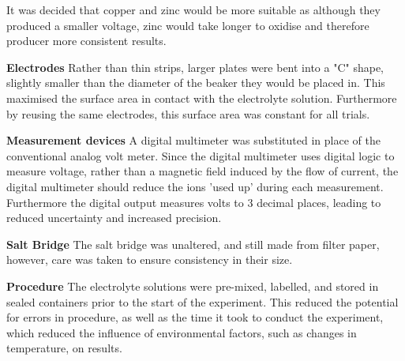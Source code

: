 \documentclass[11pt,a4paper]{article}
\begin{document}
It was decided that copper and zinc would be more suitable as although they produced a smaller voltage, zinc would take longer to oxidise and therefore producer more consistent results.

\textbf{Electrodes}\newline
Rather than thin strips, larger plates were bent into a "C" shape, slightly smaller than the diameter of the beaker they would be placed in. This maximised the surface area in contact with the electrolyte solution. Furthermore by reusing the same electrodes, this surface area was constant for all trials.

\textbf{Measurement devices}\newline
A digital multimeter was substituted in place of the conventional analog volt meter. Since the digital multimeter uses digital logic to measure voltage, rather than a magnetic field induced by the flow of current, the digital multimeter should reduce the ions 'used up' during each measurement. Furthermore the digital output measures volts to 3 decimal places, leading to reduced uncertainty and increased precision. 

\textbf{Salt Bridge}\newline
The salt bridge was unaltered, and still made from filter paper, however, care was taken to ensure consistency in their size.

\textbf{Procedure}\newline
The electrolyte solutions were pre-mixed, labelled, and stored in sealed containers prior to the start of the experiment. This reduced the potential for errors in procedure, as well as the time it took to conduct the experiment, which reduced the influence of environmental factors, such as changes in temperature, on results.
\end{document}

